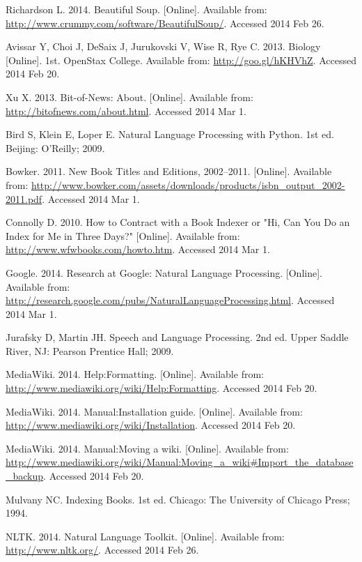 \begin{thebibliography}{99}

Richardson L. 2014. Beautiful Soup. [Online]. Available from: \url{http://www.crummy.com/software/BeautifulSoup/}. Accessed 2014 Feb 26.

Avissar Y, Choi J, DeSaix J, Jurukovski V, Wise R, Rye C. 2013. Biology [Online]. 1st. OpenStax College. Available from: \url{http://goo.gl/hKHVhZ}. Accessed 2014 Feb 20.

Xu X. 2013. Bit-of-News: About. [Online]. Available from: \url{http://bitofnews.com/about.html}. Accessed 2014 Mar 1.

Bird S, Klein E, Loper E. Natural Language Processing with Python. 1st ed. Beijing: O'Reilly; 2009.

Bowker. 2011. New Book Titles and Editions, 2002--2011. [Online]. Available from: \url{http://www.bowker.com/assets/downloads/products/isbn_output_2002-2011.pdf}. Accessed 2014 Mar 1.

Connolly D. 2010. How to Contract with a Book Indexer or "Hi, Can You Do an Index for Me in Three Days?" [Online]. Available from: \url{http://www.wfwbooks.com/howto.htm}. Accessed 2014 Mar 1.

Google. 2014. Research at Google: Natural Language Processing. [Online]. Available from: \url{http://research.google.com/pubs/NaturalLanguageProcessing.html}. Accessed 2014 Mar 1.

Jurafsky D, Martin JH. Speech and Language Processing. 2nd ed. Upper Saddle River, NJ: Pearson Prentice Hall; 2009.

MediaWiki. 2014. Help:Formatting. [Online]. Available from: \url{http://www.mediawiki.org/wiki/Help:Formatting}. Accessed 2014 Feb 20.

MediaWiki. 2014. Manual:Installation guide. [Online]. Available from: \url{http://www.mediawiki.org/wiki/Installation}. Accessed 2014 Feb 20.

MediaWiki. 2014. Manual:Moving a wiki. [Online]. Available from: \url{http://www.mediawiki.org/wiki/Manual:Moving_a_wiki#Import_the_database_backup}. Accessed 2014 Feb 20.

Mulvany NC. Indexing Books. 1st ed. Chicago: The University of Chicago Press; 1994.

NLTK. 2014. Natural Language Toolkit. [Online]. Available from: \url{http://www.nltk.org/}. Accessed 2014 Feb 26.


\end{thebibliography}
